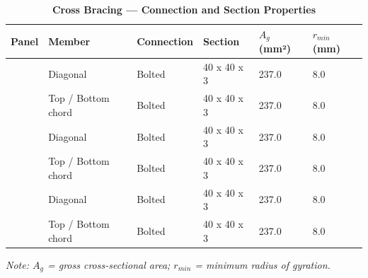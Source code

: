 \documentclass[12pt,a4paper]{report}
\numberwithin{table}{chapter}
\numberwithin{figure}{chapter}
\begin{document}
\vspace{1em}

\vspace{0.4em}
\noindent
\setlength{\tabcolsep}{4pt}
\setlength\LTleft{0pt}
\setlength\LTright{\fill}

\begin{longtable}{|C{2.0cm}|L{2.0cm}|L{2.2cm}|C{2.5cm}|C{2.0cm}|C{2.0cm}|}
\caption{\textbf{Cross Bracing --- Connection and Section Properties}}
\hline
\textbf{Panel} & \textbf{Member} & \textbf{Connection} & \textbf{Section} & \textbf{$A_g$ (mm²)} & \textbf{$r_{min}$ (mm)} \\[6pt]
\hline
{} & Diagonal & Bolted & 40 x 40 x 3 & 237.0 & 8.0 \\[6pt]
 & Top / Bottom chord & Bolted & 40 x 40 x 3 & 237.0 & 8.0 \\[6pt]
\hline
{} & Diagonal & Bolted & 40 x 40 x 3 & 237.0 & 8.0 \\[6pt]
 & Top / Bottom chord & Bolted & 40 x 40 x 3 & 237.0 & 8.0 \\[6pt]
\hline
{} & Diagonal & Bolted & 40 x 40 x 3 & 237.0 & 8.0 \\[6pt]
 & Top / Bottom chord & Bolted & 40 x 40 x 3 & 237.0 & 8.0 \\[6pt]
\hline
\end{longtable}
\noindent\textit{Note: $A_g$ = gross cross-sectional area; $r_{min}$ = minimum radius of gyration.}
\end{document}
